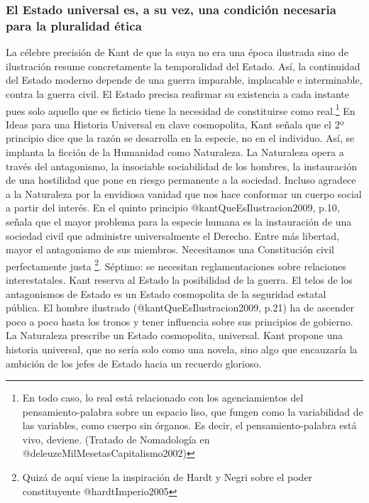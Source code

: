 \documentclass[
]{article}
\begin{document}
\hypertarget{el-estado-universal-es-a-su-vez-una-condiciuxf3n-necesaria-para-la-pluralidad-uxe9tica}{%
\subsubsection{El Estado universal es, a su vez, una condición necesaria
para la pluralidad
ética}\label{el-estado-universal-es-a-su-vez-una-condiciuxf3n-necesaria-para-la-pluralidad-uxe9tica}}

La célebre precisión de Kant de que la suya no era una época ilustrada
sino de ilustración resume concretamente la temporalidad del Estado.
Así, la continuidad del Estado moderno depende de una guerra imparable,
implacable e interminable, contra la guerra civil. El Estado precisa
reafirmar su existencia a cada instante pues solo aquello que es
ficticio tiene la necesidad de constituirse como real.\footnote{En todo
  caso, lo real está relacionado con los agenciamientos del
  pensamiento-palabra sobre un espacio liso, que fungen como la
  variabilidad de las variables, como cuerpo sin órganos. Es decir, el
  pensamiento-palabra está vivo, deviene. (Tratado de Nomadología en
  @deleuzeMilMesetasCapitalismo2002)} En Ideas para una Historia
Universal en clave cosmopolita, Kant señala que el 2º principio dice que
la razón se desarrolla en la especie, no en el individuo. Así, se
implanta la ficción de la Humanidad como Naturaleza. La Naturaleza opera
a través del antagonismo, la insociable sociabilidad de los hombres, la
instauración de una hostilidad que pone en riesgo permanente a la
sociedad. Incluso agradece a la Naturaleza por la envidiosa vanidad que
nos hace conformar un cuerpo social a partir del interés. En el quinto
principio @kantQueEsIlustracion2009, p.10, señala que el mayor problema
para la especie humana es la instauración de una sociedad civil que
administre universalmente el Derecho. Entre más libertad, mayor el
antagonismo de sus miembros. Necesitamos una Constitución civil
perfectamente justa \footnote{Quizá de aquí viene la inspiración de
  Hardt y Negri sobre el poder constituyente @hardtImperio2005}.
Séptimo: se necesitan reglamentaciones sobre relaciones interestatales.
Kant reserva al Estado la posibilidad de la guerra. El telos de los
antagonismos de Estado es un Estado cosmopolita de la seguridad estatal
pública. El hombre ilustrado (@kantQueEsIlustracion2009, p.21) ha de
ascender poco a poco hasta los tronos y tener influencia sobre sus
principios de gobierno. La Naturaleza prescribe un Estado cosmopolita,
universal. Kant propone una historia universal, que no sería solo como
una novela, sino algo que encauzaría la ambición de los jefes de Estado
hacia un recuerdo glorioso.
\end{document}
